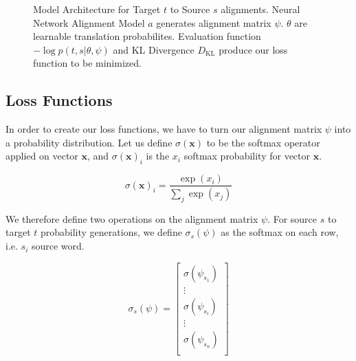 \documentclass[twoside,twocolumn]{article}
\renewcommand{\vec}[1]{\mathbf{#1}}
\begin{document}
\begin{figure}
\centering
{}
\caption{Model Architecture for Target $t$ to Source $s$ alignments. Neural Network Alignment Model $a$ generates alignment matrix $\psi$. $\theta$ are learnable translation probabilites. Evaluation function $- \log p(t, s | \theta, \psi)$ and KL Divergence $D_{\mathrm{KL}}$ produce our loss function to be minimized.}
\end{figure}

\subsection{Loss Functions}
In order to create our loss functions, we have to turn our alignment matrix $\psi$ into a probability distribution. Let us define $\sigma(\vec{x})$ to be the softmax operator applied on vector $\vec{x}$, and $\sigma(\vec{x})_i$ is the $x_i$ softmax probability for vector $\vec{x}$.

\begin{equation}
\sigma(\vec{x})_i = \frac{\exp(x_i)}{\sum_j\exp(x_j)}
\end{equation}

We therefore define two operations on the alignment matrix $\psi$. For source $s$ to target $t$ probability generations, we define $\sigma_s(\psi)$ as the softmax on each row, i.e. $s_i$ source word.

\begin{equation}
  \sigma_s(\psi) = \left[
    \begin{matrix}
      \sigma(\psi_{s_1})  \\
      \vdots \\
      \sigma(\psi_{s_i})  \\
      \vdots \\
      \sigma(\psi_{s_n})  \\
    \end{matrix}
\right]
\end{equation}
\end{document}

